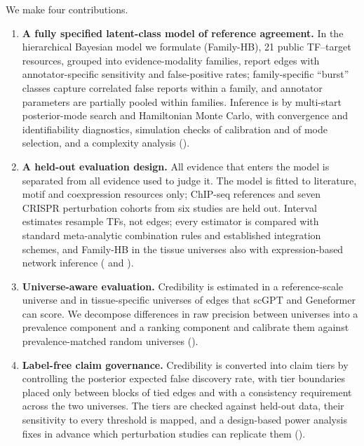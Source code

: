 \documentclass[11pt,a4paper]{article}
\begin{document}
We make four contributions.
\begin{enumerate}
  \item \textbf{A fully specified latent-class model of reference agreement.} In the hierarchical Bayesian model we formulate (Family-HB), 21 public TF--target resources, grouped into evidence-modality families, report edges with annotator-specific sensitivity and false-positive rates; family-specific ``burst'' classes capture correlated false reports within a family, and annotator parameters are partially pooled within families. Inference is by multi-start posterior-mode search and Hamiltonian Monte Carlo, with convergence and identifiability diagnostics, simulation checks of calibration and of mode selection, and a complexity analysis ().
  \item \textbf{A held-out evaluation design.} All evidence that enters the model is separated from all evidence used to judge it. The model is fitted to literature, motif and coexpression resources only; ChIP-seq references and seven CRISPR perturbation cohorts from six studies are held out. Interval estimates resample TFs, not edges; every estimator is compared with standard meta-analytic combination rules and established integration schemes, and Family-HB in the tissue universes also with expression-based network inference ( and ).
  \item \textbf{Universe-aware evaluation.} Credibility is estimated in a reference-scale universe and in tissue-specific universes of edges that scGPT and Geneformer can score. We decompose differences in raw precision between universes into a prevalence component and a ranking component and calibrate them against prevalence-matched random universes ().
  \item \textbf{Label-free claim governance.} Credibility is converted into claim tiers by controlling the posterior expected false discovery rate, with tier boundaries placed only between blocks of tied edges and with a consistency requirement across the two universes. The tiers are checked against held-out data, their sensitivity to every threshold is mapped, and a design-based power analysis fixes in advance which perturbation studies can replicate them ().
\end{enumerate}
\end{document}
